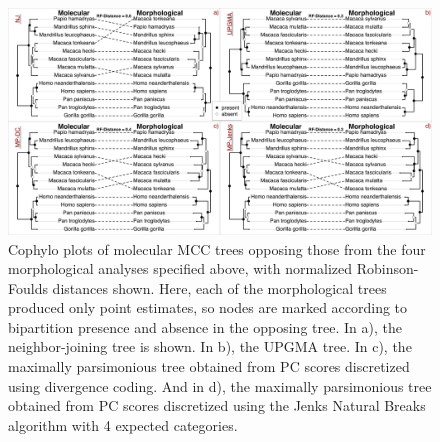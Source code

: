\documentclass[10pt, twocolumn, twoside]{article}
\begin{document}
\begin{figure}[h]
\centering
\includegraphics[width=160mm]{figures/harvati_figure2_final.pdf}
\caption[Visualizing Results of Heuristic Phylogenetic Analyses of Catarrhine Landmark Data]{Cophylo plots of molecular MCC trees opposing those from the four morphological analyses specified above, with normalized Robinson-Foulds distances shown. Here, each of the morphological trees produced only point estimates, so nodes are marked according to bipartition presence and absence in the opposing tree. In a), the neighbor-joining tree is shown. In b), the UPGMA tree. In c), the maximally parsimonious tree obtained from PC scores discretized using divergence coding. And in d), the maximally parsimonious tree obtained from PC scores discretized using the Jenks Natural Breaks algorithm with 4 expected categories. \label{overflow}
\label{fig:harvatiFigure2}}
\end{figure}
\end{document}

